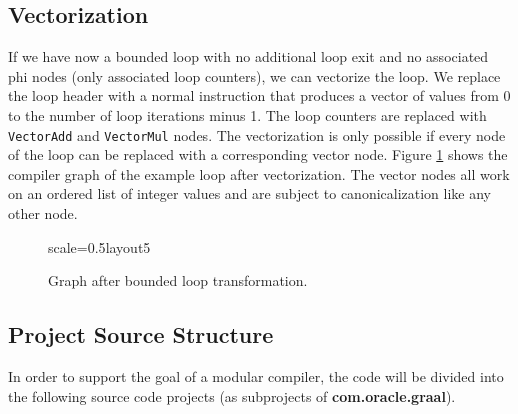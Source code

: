 \documentclass[twocolumn]{svjour3}
\begin{document}
\subsection{Vectorization}

If we have now a bounded loop with no additional loop exit and no associated phi nodes (only associated loop counters), we can vectorize the loop.
We replace the loop header with a normal instruction that produces a vector of values from 0 to the number of loop iterations minus 1.
The loop counters are replaced with \texttt{VectorAdd} and \texttt{VectorMul} nodes.
The vectorization is only possible if every node of the loop can be replaced with a corresponding vector node.
Figure \ref{fig:loop5} shows the compiler graph of the example loop after vectorization.
The vector nodes all work on an ordered list of integer values and are subject to canonicalization like any other node.


\begin{figure}[h]
  \label{fig:loop5}
  \centering
\begin{digraphenv}{scale=0.5}{layout5}
\end{digraphenv}
  \caption{Graph after bounded loop transformation.}
\end{figure}

\subsection{Project Source Structure}
In order to support the goal of a modular compiler, the code will be divided into the following source code projects (as subprojects of \textbf{com.oracle.graal}).
\end{document}
